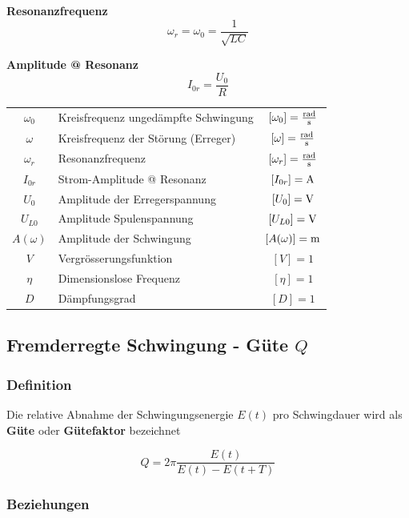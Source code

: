 \begin{minipage}{0.48\linewidth}
\textbf{Resonanzfrequenz}
$$ \boxed{ \omega_r = \omega_0 = \frac{1}{\sqrt{LC}} } $$ 
\end{minipage}
\hfill
\begin{minipage}{0.48\linewidth}
\textbf{Amplitude @ Resonanz}
$$ \boxed{ I_{0r} = \frac{U_0}{R} } $$ 
\end{minipage}


\vspace{0.2cm}


\begin{tabular}{c l c}
\rule{0pt}{10pt} $\omega_0$ & Kreisfrequenz ungedämpfte Schwingung & $[\omega_0] = \frac{\mathrm{rad}}{\mathrm{s}}$ \\
\rule{0pt}{10pt} $\omega$ & Kreisfrequenz der Störung (Erreger) & $[\omega] = \frac{\mathrm{rad}}{\mathrm{s}}$ \\
\rule{0pt}{10pt} $\omega_r$ & Resonanzfrequenz & $[\omega_r] = \frac{\mathrm{rad}}{\mathrm{s}}$ \\
$I_{0r}$ & Strom-Amplitude @ Resonanz & $[I_{0r}] = \mathrm{A}$ \\
$U_0$ & Amplitude der Erregerspannung & $[U_0] = \mathrm{V}$ \\
$U_{L0}$ & Amplitude Spulenspannung & $[U_{L0}] = \mathrm{V}$ \\
$A(\omega)$ & Amplitude der Schwingung & $[A(\omega)] = \mathrm{m}$ \\
$V$ & Vergrösserungsfunktion & $[V] = 1$ \\
$\eta$ & Dimensionslose Frequenz & $[\eta] = 1$  \\
$D$ & Dämpfungsgrad & $[D] = 1$ 
\end{tabular}





\subsection{Fremderregte Schwingung - Güte $Q$}
\subsubsection{Definition}

Die relative Abnahme der Schwingungsenergie $E(t)$ pro Schwingdauer wird als \textbf{Güte} oder \textbf{Gütefaktor} bezeichnet 

$$ \boxed{ Q = 2 \pi \frac{E(t)}{E(t) - E(t + T)} }$$ 



\subsubsection{Beziehungen}

